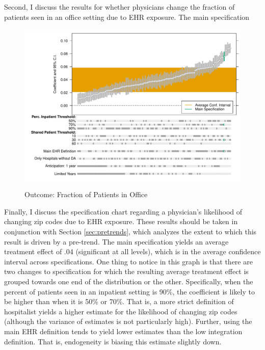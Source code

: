 \documentclass[12pt]{article}
\begin{document}
Second, I discuss the results for whether physicians change the fraction of patients seen in an office setting due to EHR exposure. The main specification

\begin{figure}[ht]
    \centering
    \caption{Outcome: Fraction of Patients in Office}
    \includegraphics[scale=.6]{Objects/office_frac_chart.pdf}
    \label{fig:fracoffice_chart}
\end{figure}

Finally, I discuss the specification chart regarding a physician's likelihood of changing zip codes due to EHR exposure. These results should be taken in conjunction with Section \ref{sec:pretrends}, which analyzes the extent to which this result is driven by a pre-trend. The main specification yields an average treatment effect of .04 (significant at all levels), which is in the average confidence interval across specifications. One thing to notice in this graph is that there are two changes to specification for which the resulting average treatment effect is grouped towards one end of the distribution or the other. Specifically, when the percent of patients seen in an inpatient setting is 90\%, the coefficient is likely to be higher than when it is 50\% or 70\%. That is, a more strict definition of hospitalist yields a higher estimate for the likelihood of changing zip codes (although the variance of estimates is not particularly high). Further, using the main EHR definition tends to yield lower estimates than the low integration definition. That is, endogeneity is biasing this estimate slightly down. 
\end{document}
